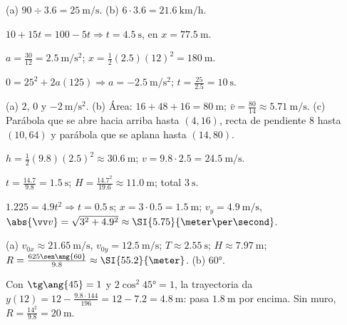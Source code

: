 \documentclass[11pt,a4paper]{article}
\begin{document}
\respuestas
\begin{respuestascortas}
\begin{soluciones}
\item (a) $90\div3.6=\SI{25}{\meter\per\second}$. (b) $6\cdot3.6=\SI{21.6}{\kilo\meter\per\hour}$.
\item $10+15t=100-5t\Rightarrow t=\SI{4.5}{\second}$, en $x=\SI{77.5}{\meter}$.
\item $a=\frac{30}{12}=\SI{2.5}{\meter\per\second\squared}$; $x=\tfrac12(2.5)(12)^2=\SI{180}{\meter}$.
\item $0=25^2+2a(125)\Rightarrow a=-\SI{2.5}{\meter\per\second\squared}$; $t=\frac{25}{2.5}=\SI{10}{\second}$.
\item (a) $2$, $0$ y $-\SI{2}{\meter\per\second\squared}$. (b) Área: $16+48+16=\SI{80}{\meter}$;
  $\bar v=\frac{80}{14}\approx\SI{5.71}{\meter\per\second}$. (c) Parábola que se abre hacia arriba hasta $(4,16)$,
  recta de pendiente $8$ hasta $(10,64)$ y parábola que se aplana hasta $(14,80)$.
\item $h=\tfrac12(9.8)(2.5)^2\approx\SI{30.6}{\meter}$; $v=9.8\cdot2.5=\SI{24.5}{\meter\per\second}$.
\item $t=\frac{14.7}{9.8}=\SI{1.5}{\second}$; $H=\frac{14.7^2}{19.6}\approx\SI{11.0}{\meter}$; total $\SI{3}{\second}$.
\item $1.225=4.9t^2\Rightarrow t=\SI{0.5}{\second}$; $x=3\cdot0.5=\SI{1.5}{\meter}$; $v_y=\SI{4.9}{\meter\per\second}$,
  $\abs{\vv v}=\sqrt{3^2+4.9^2}\approx\SI{5.75}{\meter\per\second}$.
\item (a) $v_{0x}\approx\SI{21.65}{\meter\per\second}$, $v_{0y}=\SI{12.5}{\meter\per\second}$; $T\approx\SI{2.55}{\second}$;
  $H\approx\SI{7.97}{\meter}$; $R=\frac{625\sen\ang{60}}{9.8}\approx\SI{55.2}{\meter}$. (b) \ang{60}.
\item Con $\tg\ang{45}=1$ y $2\cos^2\ang{45}=1$, la trayectoria da $y(12)=12-\frac{9.8\cdot144}{196}=12-7.2=\SI{4.8}{\meter}$:
  pasa $\SI{1.8}{\meter}$ por encima. Sin muro, $R=\frac{14^2}{9.8}=\SI{20}{\meter}$.
\end{soluciones}
\end{respuestascortas}
\end{document}
